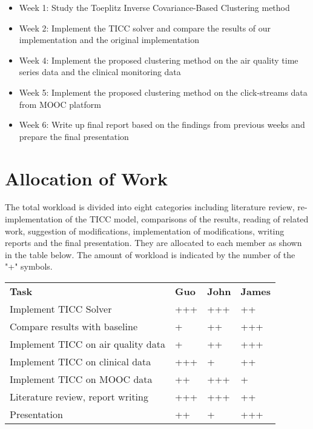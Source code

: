 \documentclass{llncs}
\begin{document}
\begin{itemize}
\item Week 1: Study the Toeplitz Inverse Covariance-Based Clustering method

\item Week 2: Implement the TICC solver and compare the results of our implementation and the original implementation

\item Week 4: Implement the proposed clustering method on the air quality time series data and the clinical monitoring data
\item Week 5: Implement the proposed clustering method on the click-streams data from MOOC platform
\item Week 6: Write up final report based on the findings from previous weeks and prepare the final presentation
\end{itemize}

\section{Allocation of Work}

The total workload is divided into eight categories including literature review, re-implementation of the TICC model, comparisons of the results, reading of related work, suggestion of modifications, implementation of modifications, writing reports and the final presentation. They are allocated to each member as shown in the table below. The amount of workload is indicated by the number of the "+" symbols. 
\begin{table}[]
\centering
\begin{tabular}{llll}{\bf Task}
                              & \bf Guo & \bf John & \bf James \\

Implement TICC Solver         & +++ & +++  & ++    \\
Compare results with baseline & +  & ++    & +++   \\
Implement TICC on air quality data   & + & ++  & +++    \\
Implement TICC on clinical data   & +++ & +  & ++    \\
Implement TICC on MOOC data      & ++ & +++  & +  \\
Literature review, report writing                & +++  & +++ & ++     \\
Presentation                  & ++   & +    & +++
\end{tabular}
\end{table}
\end{document}
